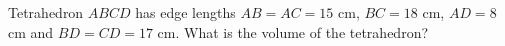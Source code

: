 Tetrahedron $ABCD$ has edge lengths $AB=AC=15$ cm, $BC=18$ cm, $AD=8$ cm and $BD=CD=17$ cm. What is the volume of the tetrahedron?

